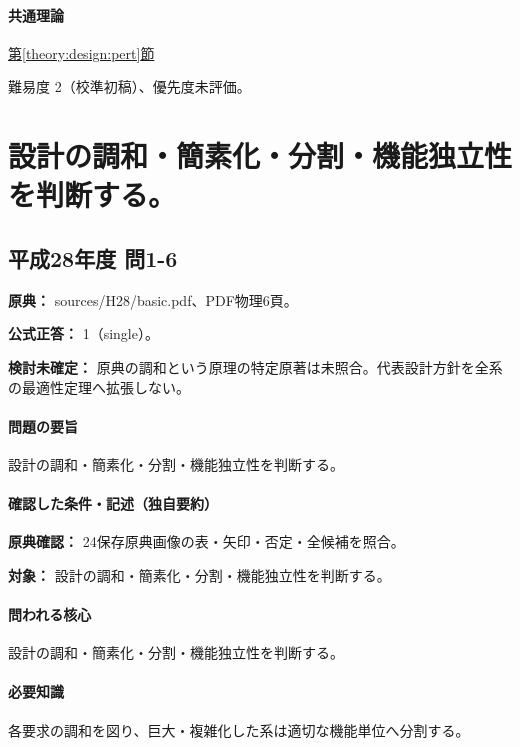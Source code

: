 \paragraph{共通理論} \hyperref[theory:design:pert]{第\ref*{theory:design:pert}節}

\par 難易度 2（校準初稿）、優先度未評価。

\section{設計の調和・簡素化・分割・機能独立性を判断する。}

\subsection{平成28年度 問1-6}
\label{q:h28-reg-basic-1-6}

\noindent\textbf{原典：} sources/H28/basic.pdf、PDF物理6頁。

\textbf{公式正答：} 1（single）。

\par\textbf{検討未確定：} 原典の調和という原理の特定原著は未照合。代表設計方針を全系の最適性定理へ拡張しない。

\paragraph{問題の要旨} 設計の調和・簡素化・分割・機能独立性を判断する。

\paragraph{確認した条件・記述（独自要約）}\mbox{}\par

\noindent\textbf{原典確認：} 24保存原典画像の表・矢印・否定・全候補を照合。\par

\noindent\textbf{対象：} 設計の調和・簡素化・分割・機能独立性を判断する。\par

\paragraph{問われる核心} 設計の調和・簡素化・分割・機能独立性を判断する。

\paragraph{必要知識} 各要求の調和を図り、巨大・複雑化した系は適切な機能単位へ分割する。

